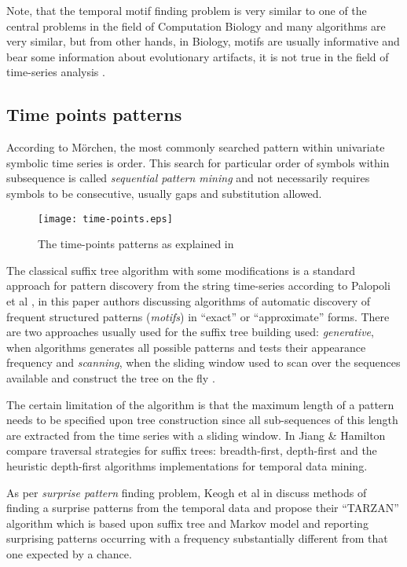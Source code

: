 Note, that the temporal motif finding problem is very similar to one of the central problems in the field of Computation Biology \cite{citeulike:465665} and many algorithms are very similar, but from other hands, in Biology, motifs are usually informative and bear some information about evolutionary artifacts, it is not true in the field of time-series analysis \cite{citeulike:3978085}.

\subsection{Time points patterns}
According to M\"orchen, the most commonly searched pattern within univariate symbolic time series is order. This search for particular order of symbols within subsequence is called \textit{sequential pattern mining} \cite{citeulike:775528} and not necessarily requires symbols to be consecutive, usually gaps and substitution allowed.

\begin{figure}[tbp]
   \centering
   \texttt{[image: time-points.eps]}
   \caption{The time-points patterns as explained in \cite{citeulike:1748833}}
   \label{fig:timepoints}
\end{figure}

The classical suffix tree algorithm \cite{citeulike:707616} with some modifications is a standard approach for pattern discovery from the string time-series according to Palopoli et al \cite{citeulike:5003338}, in this paper authors discussing algorithms of automatic discovery of frequent structured patterns (\textit{motifs}) in ``exact'' or ``approximate'' forms. There are two approaches usually used for the suffix tree building used: \textit{generative}, when algorithms generates all possible patterns and tests their appearance frequency \cite{citeulike:5012661} and \textit{scanning}, when the sliding window used to scan over the sequences available and construct the tree on the fly \cite{citeulike:5012661}. 

The certain limitation of the algorithm is that the maximum length of a pattern needs to be specified upon tree construction since all sub-sequences of this length are extracted from the time series with a sliding window. In \cite{citeulike:5003404} Jiang \& Hamilton compare traversal strategies for suffix trees: breadth-first, depth-first and the heuristic depth-first algorithms implementations for temporal data mining.

As per \textit{surprise pattern} finding problem, Keogh et al in \cite{citeulike:3025877} discuss methods of finding a surprise patterns from the temporal data and propose their ``TARZAN'' algorithm which is based upon suffix tree and Markov model and reporting surprising patterns occurring with a frequency substantially different from that one expected by a chance.

